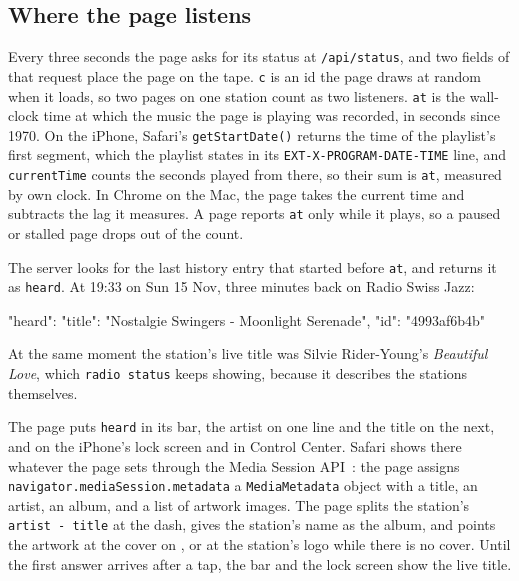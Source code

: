 \documentclass[11pt,a4paper]{article}
\begin{document}
\subsection*{Where the page listens}

Every three seconds the page asks  for its status at \texttt{/api/status}, and two fields of that request place the page on the tape. \texttt{c} is an id the page draws at random when it loads, so two pages on one station count as two listeners. \texttt{at} is the wall-clock time at which the music the page is playing was recorded, in seconds since 1970. On the iPhone, Safari's \texttt{getStartDate()} returns the time of the playlist's first segment, which the playlist states in its \texttt{EXT-X-PROGRAM-DATE-TIME} line, and \texttt{currentTime} counts the seconds played from there, so their sum is \texttt{at}, measured by  own clock. In Chrome on the Mac, the page takes the current time and subtracts the lag it measures. A page reports \texttt{at} only while it plays, so a paused or stalled page drops out of the count.

The server looks for the last history entry that started before \texttt{at}, and returns it as \texttt{heard}. At 19:33 on Sun 15 Nov, three minutes back on Radio Swiss Jazz:

\begin{pane}
$ curl -s "localhost:8080/api/status?c=lesson&slug=radio-swiss-jazz&at=$(( $(date +%
    | grep -o '"heard": {[^}]*}'   # the piece three minutes back
\end{pane}
\begin{cmdout}
"heard": {"title": "Nostalgie Swingers - Moonlight Serenade", "id": "4993af6b4b"}
\end{cmdout}

At the same moment the station's live title was Silvie Rider-Young's \textit{Beautiful Love}, which \texttt{radio status} keeps showing, because it describes the stations themselves.

The page puts \texttt{heard} in its bar, the artist on one line and the title on the next, and on the iPhone's lock screen and in Control Center. Safari shows there whatever the page sets through the Media Session API~\cite{mediasession}: the page assigns \texttt{navigator.mediaSession.metadata} a \texttt{MediaMetadata} object with a title, an artist, an album, and a list of artwork images. The page splits the station's \texttt{artist - title} at the dash, gives the station's name as the album, and points the artwork at the cover on , or at the station's logo while there is no cover. Until the first answer arrives after a tap, the bar and the lock screen show the live title.
\end{document}
